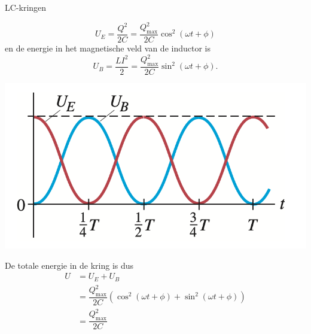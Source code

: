 \begin{app}[LC-kringen]{LC-kringen}
    \begin{minipage}{.70\textwidth}
        \begin{equation*}
            U_{E} = \dfrac{Q^{2}}{2C} = \dfrac{Q_{\max}^2}{2C}\cos^2(\omega t + \phi)
        \end{equation*}
        \hspace{-0.6cm} en de energie in het magnetische veld van de inductor is 
        \begin{equation*}
            U_{B} = \dfrac{LI^{2}}{2} = \dfrac{Q_{\max}^2}{2C}\sin^2(\omega t + \phi).
        \end{equation*}
    \end{minipage}
    \begin{minipage}{.26\textwidth}
        \vspace{0cm}\hspace{-1.4cm}\includegraphics[scale = 0.4]{Images/Magnetisme/LCKringOscillatie.png} 
    \end{minipage}
    De totale energie in de kring is dus
    \begin{align*}
        U &= U_{E} + U_{B} \\
          &= \dfrac{Q_{\max}^2}{2C}\left(\cos^2(\omega t + \phi) +\sin^2(\omega t + \phi)\right) \\ 
          &= \dfrac{Q_{\max}^2}{2C}
    \end{align*}
    \vspace{-0.3cm}
\end{app}

\newpage

